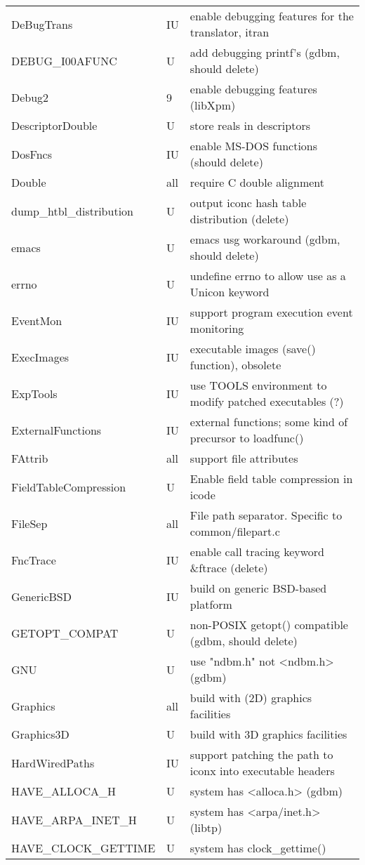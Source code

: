 \begin{xtabular}{|m{1.8in}|m{0.5in}|m{4.0in}|}
DeBugTrans & IU & enable debugging features for the translator, itran \\
DEBUG\_I00AFUNC & U & add debugging printf's (gdbm, should delete) \\
Debug2 & 9 & enable debugging features (libXpm) \\
DescriptorDouble & U & store reals in descriptors \\
DosFncs & IU & enable MS-DOS functions (should delete) \\
Double & all & require C double alignment \\
dump\_htbl\_distribution & U & output iconc hash table distribution (delete) \\
emacs & U & emacs usg workaround (gdbm, should delete) \\
errno & U & undefine errno to allow use as a Unicon keyword \\
EventMon & IU & support program execution event monitoring \\
ExecImages & IU & executable images (save() function), obsolete \\
ExpTools & IU & use TOOLS environment to modify patched executables (?) \\
ExternalFunctions & IU & external functions; some kind of precursor to loadfunc() \\
FAttrib & all & support file attributes \\
FieldTableCompression & U & Enable field table compression in icode \\
FileSep & all & File path separator. Specific to common/filepart.c \\
FncTrace & IU & enable call tracing keyword \&ftrace (delete) \\
GenericBSD & IU & build on generic BSD-based platform \\
GETOPT\_COMPAT & U & non-POSIX getopt() compatible (gdbm, should delete) \\
GNU & U & use "ndbm.h" not <ndbm.h> (gdbm) \\
Graphics & all & build with (2D) graphics facilities \\
Graphics3D & U & build with 3D graphics facilities \\
HardWiredPaths & IU & support patching the path to iconx into executable headers \\
HAVE\_ALLOCA\_H & U & system has <alloca.h> (gdbm) \\
HAVE\_ARPA\_INET\_H & U & system has <arpa/inet.h> (libtp) \\
HAVE\_CLOCK\_GETTIME & U & system has clock\_gettime() \\

\end{xtabular}
